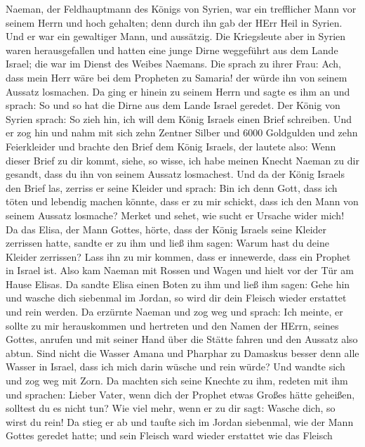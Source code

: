  Naeman, der Feldhauptmann des Königs von Syrien, war ein
trefflicher Mann vor seinem Herrn und hoch gehalten; denn durch ihn gab
der HErr Heil in Syrien. Und er war ein gewaltiger Mann, und aussätzig.
 Die Kriegsleute aber in Syrien waren herausgefallen und
hatten eine junge Dirne weggeführt aus dem Lande Israel; die war im
Dienst des Weibes Naemans.  Die sprach zu ihrer Frau: Ach,
dass mein Herr wäre bei dem Propheten zu Samaria! der würde ihn von
seinem Aussatz losmachen.  Da ging er hinein zu seinem Herrn
und sagte es ihm an und sprach: So und so hat die Dirne aus dem Lande
Israel geredet.  Der König von Syrien sprach: So zieh hin,
ich will dem König Israels einen Brief schreiben. Und er zog hin und
nahm mit sich zehn Zentner Silber und 6000 Goldgulden und zehn
Feierkleider  und brachte den Brief dem König Israels, der
lautete also: Wenn dieser Brief zu dir kommt, siehe, so wisse, ich habe
meinen Knecht Naeman zu dir gesandt, dass du ihn von seinem Aussatz
losmachest.  Und da der König Israels den Brief las, zerriss
er seine Kleider und sprach: Bin ich denn Gott, dass ich töten und
lebendig machen könnte, dass er zu mir schickt, dass ich den Mann von
seinem Aussatz losmache? Merket und sehet, wie sucht er Ursache wider
mich!  Da das Elisa, der Mann Gottes, hörte, dass der König
Israels seine Kleider zerrissen hatte, sandte er zu ihm und ließ ihm
sagen: Warum hast du deine Kleider zerrissen? Lass ihn zu mir kommen,
dass er innewerde, dass ein Prophet in Israel ist.  Also kam
Naeman mit Rossen und Wagen und hielt vor der Tür am Hause Elisas.
 Da sandte Elisa einen Boten zu ihm und ließ ihm sagen:
Gehe hin und wasche dich siebenmal im Jordan, so wird dir dein Fleisch
wieder erstattet und rein werden.  Da erzürnte Naeman und
zog weg und sprach: Ich meinte, er sollte zu mir herauskommen und
hertreten und den Namen der HErrn, seines Gottes, anrufen und mit seiner
Hand über die Stätte fahren und den Aussatz also abtun. 
Sind nicht die Wasser Amana und Pharphar zu Damaskus besser denn alle
Wasser in Israel, dass ich mich darin wüsche und rein würde? Und wandte
sich und zog weg mit Zorn.  Da machten sich seine Knechte
zu ihm, redeten mit ihm und sprachen: Lieber Vater, wenn dich der
Prophet etwas Großes hätte geheißen, solltest du es nicht tun? Wie viel
mehr, wenn er zu dir sagt: Wasche dich, so wirst du rein! 
Da stieg er ab und taufte sich im Jordan siebenmal, wie der Mann Gottes
geredet hatte; und sein Fleisch ward wieder erstattet wie das Fleisch
